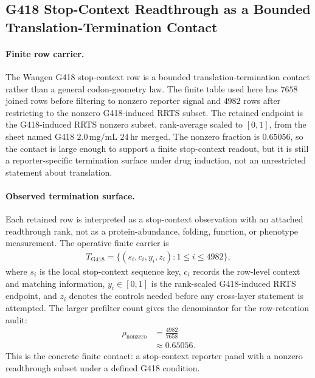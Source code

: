 
\subsection{G418 Stop-Context Readthrough as a Bounded Translation-Termination Contact}
\label{sec:bioreality-g418-stop-context-readthrough-wangen2020}

\paragraph{Finite row carrier.}
The Wangen G418 stop-context row is a bounded translation-termination contact rather than a general codon-geometry law. The finite table used here has $7658$ joined rows before filtering to nonzero reporter signal and $4982$ rows after restricting to the nonzero G418-induced RRTS subset. The retained endpoint is the G418-induced RRTS nonzero subset, rank-average scaled to $[0,1]$, from the sheet named G418 $2.0\,\mathrm{mg}/\mathrm{mL}$ $24\,\mathrm{hr}$ merged. The nonzero fraction is $0.65056$, so the contact is large enough to support a finite stop-context readout, but it is still a reporter-specific termination surface under drug induction, not an unrestricted statement about translation.

\paragraph{Observed termination surface.}
Each retained row is interpreted as a stop-context observation with an attached readthrough rank, not as a protein-abundance, folding, function, or phenotype measurement. The operative finite carrier is
$$
\begin{aligned}
T_{\mathrm{G418}} = \{(s_i,c_i,y_i,z_i): 1 \leq i \leq 4982\},
\end{aligned}
$$
where $s_i$ is the local stop-context sequence key, $c_i$ records the row-level context and matching information, $y_i \in [0,1]$ is the rank-scaled G418-induced RRTS endpoint, and $z_i$ denotes the controls needed before any cross-layer statement is attempted. The larger prefilter count gives the denominator for the row-retention audit:
$$
\begin{aligned}
\rho_{\mathrm{nonzero}} &= \frac{4982}{7658} \\
&\approx 0.65056.
\end{aligned}
$$
This is the concrete finite contact: a stop-context reporter panel with a nonzero readthrough subset under a defined G418 condition.

